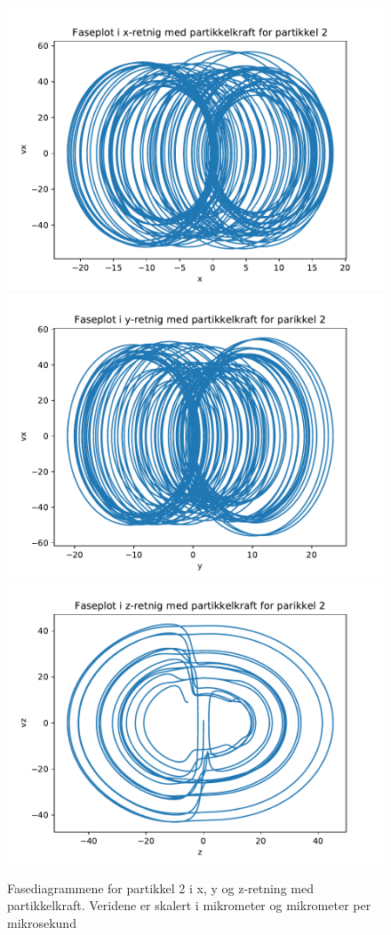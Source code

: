 \documentclass[reprint,english,notitlepage]{revtex4-1}  %
\begin{document}
\begin{figure}[H]
	\label{faseint2}
	\centering 
	\includegraphics[scale=0.4]{../pythonplots/xint2.pdf}
	\includegraphics[scale=0.4]{../pythonplots/yint2.pdf}
	\includegraphics[scale=0.4]{../pythonplots/zint2.pdf}
	\caption{Fasediagrammene for partikkel 2 i x, y og z-retning med partikkelkraft. Veridene er skalert i mikrometer og mikrometer per mikrosekund}
\end{figure}
\end{document}

